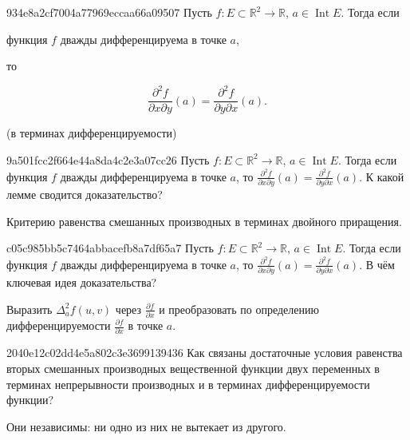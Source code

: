 \begin{note}{934e8a2cf7004a77969eccaa66a09507}
    Пусть \({ f : E \subset \mathbb R^2 \to \mathbb R }\),\: \({ a \in \operatorname{Int} E }\).
    Тогда если \begin{icloze}{1}функция \({ f }\) дважды дифференцируема в точке \({ a }\),\end{icloze}
    то
    \begin{icloze}{2}
        \[
            \frac{\partial^2 f}{\partial x \partial y}(a) = \frac{\partial^2 f}{\partial y \partial x}(a).
        \]
    \end{icloze}

    \begin{center}
        \tiny
        (в терминах дифференцируемости)
    \end{center}
\end{note}

\begin{note}{9a501fcc2f664e44a8da4c2e3a07cc26}
    Пусть \({ f : E \subset \mathbb R^2 \to \mathbb R }\),\: \({ a \in \operatorname{Int} E }\).
    Тогда если функция \({ f }\) дважды дифференцируема в точке \({ a }\),
    то \({ \frac{\partial^2 f}{\partial x \partial y}(a) = \frac{\partial^2 f}{\partial y \partial x}(a) }\).
    К какой лемме сводится доказательство?

    \begin{cloze}{1}
        Критерию равенства смешанных производных в терминах двойного приращения.
    \end{cloze}
\end{note}

\begin{note}{c05c985bb5c7464abbacefb8a7df65a7}
    Пусть \({ f : E \subset \mathbb R^2 \to \mathbb R }\),\: \({ a \in \operatorname{Int} E }\).
    Тогда если функция \({ f }\) дважды дифференцируема в точке \({ a }\),
    то \({ \frac{\partial^2 f}{\partial x \partial y}(a) = \frac{\partial^2 f}{\partial y \partial x}(a) }\).
    В чём ключевая идея доказательства?

    \begin{cloze}{1}
        Выразить \({ \Delta_{a}^2 f(u, v) }\) через \({ \frac{\partial f}{\partial x} }\) и преобразовать по определению дифференцируемости \({ \frac{\partial f}{\partial x} }\) в точке \({ a }\).
    \end{cloze}
\end{note}

\begin{note}{2040e12c02dd4e5a802c3e3699139436}
    Как связаны достаточные условия равенства вторых смешанных производных вещественной функции двух переменных в терминах
    непрерывности производных и в терминах дифференцируемости функции?

    \begin{cloze}{1}
        Они независимы: ни одно из них не вытекает из другого.
    \end{cloze}
\end{note}

